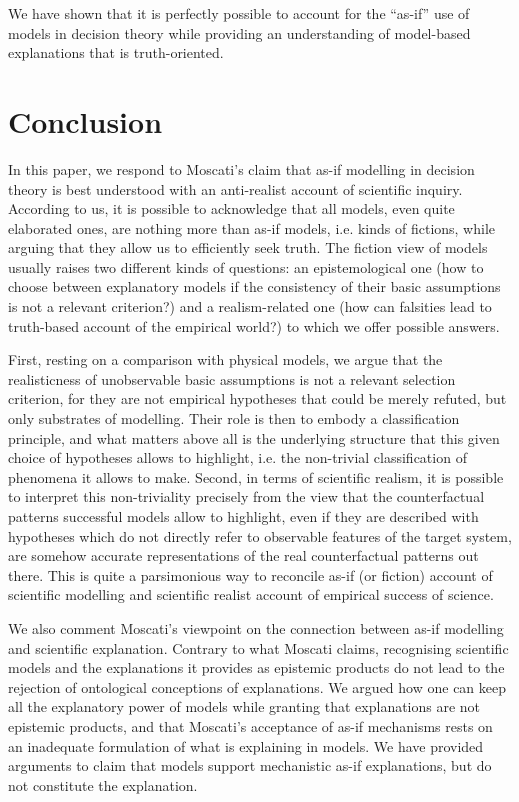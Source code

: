 \documentclass[a4paper,11pt]{article}
\theoremstyle{definition}
\begin{document}
We have shown that it is perfectly possible to account for the ``as-if'' use of models in decision theory while providing an understanding of model-based explanations that is truth-oriented.

\section{Conclusion}
In this paper, we respond to Moscati's claim that as-if modelling in decision theory is best understood with an anti-realist account of scientific inquiry. According to us, it is possible to acknowledge that all models, even quite elaborated ones, are nothing more than as-if models, i.e. kinds of fictions, while arguing that they allow us to efficiently seek truth. The fiction view of models usually raises two different kinds of questions: an epistemological one (how to choose between explanatory models if the consistency of their basic assumptions is not a relevant criterion?) and a realism-related one (how can falsities lead to truth-based account of the empirical world?) to which we offer possible answers. 

First, resting on a comparison with physical models, we argue that the realisticness of unobservable basic assumptions is not a relevant selection criterion, for they are not empirical hypotheses that could be merely refuted, but only substrates of modelling. Their role is then to embody a classification principle, and what matters above all is the underlying structure that this given choice of hypotheses allows to highlight, i.e. the non-trivial classification of phenomena it allows to make. Second, in terms of scientific realism, it is possible to interpret this non-triviality precisely from the view that the counterfactual patterns successful models allow to highlight, even if they are described with hypotheses which do not directly refer to observable features of the target system, are somehow accurate representations of the real counterfactual patterns out there. This is quite a parsimonious way to reconcile as-if (or fiction) account of scientific modelling and scientific realist account of empirical success of science. 

We also comment Moscati's viewpoint on the connection between as-if modelling and scientific explanation. Contrary to what Moscati claims, recognising scientific models and the explanations it provides as epistemic products do not lead to the rejection of ontological conceptions of explanations. We argued how one can keep all the explanatory power of models while granting that explanations are not epistemic products, and that Moscati's acceptance of as-if mechanisms rests on an inadequate formulation of what is explaining in models. We have provided arguments to claim that models support mechanistic as-if explanations, but do not constitute the explanation.


 

\end{document}
